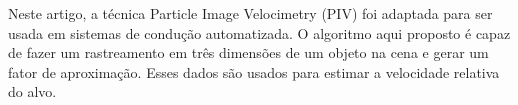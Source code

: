 Neste artigo, a técnica Particle Image Velocimetry (PIV) foi adaptada 
para ser usada em sistemas de condução automatizada.
O algoritmo aqui proposto é capaz de fazer um rastreamento em três dimensões 
de um objeto na cena e gerar um fator de aproximação. 
Esses dados são usados para estimar a velocidade relativa do alvo.